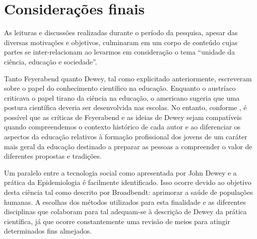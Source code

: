 \documentclass[12pt]{report}
\begin{document}
	\vspace*{-0.6cm}
	\chapter*{Considerações finais}
	\vspace*{-0.75cm}
	
	As leituras e discussões realizadas durante o período da pesquisa, apesar das diversas motivações e objetivos, culminaram em um corpo de conteúdo cujas partes se inter-relacionam ao levarmos em consideração o tema ``unidade da ciência, educação e sociedade''.
	
	Tanto Feyerabend quanto Dewey, tal como explicitado anteriormente, escreveram sobre o papel do conhecimento científico na educação.
	Enquanto o austríaco criticava o papel tirano da ciência na educação, o americano sugeria que uma postura científica deveria ser desenvolvida nas escolas.
	No entanto, conforme \textcite{cunha_sci_and_edu}, é possível que as críticas de Feyerabend e as ideias de Dewey sejam compatíveis quando compreendemos o contexto histórico de cada autor e ao diferenciar os aspectos da educação relativos à formação profissional dos jovens de um caráter mais geral da educação destinado a preparar as pessoas a compreender o valor de diferentes propostas e tradições.
	
	Um paralelo entre a tecnologia social como apresentada por John Dewey e a prática da Epidemiologia é facilmente identificado.
	Isso ocorre devido ao objetivo desta ciência tal como descrito por Broadbendt: aprimorar a saúde de populações humanas.
	A escolhas dos métodos utilizados para esta finalidade e as diferentes disciplinas que colaboram para tal adequam-se à descrição de Dewey da prática científica, já que ocorre constantemente uma revisão de meios para atingir determinados fins almejados.
	
\end{document}
